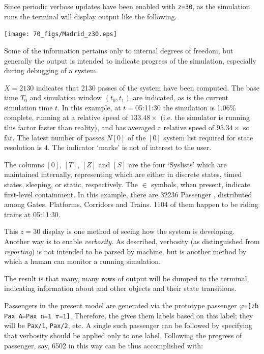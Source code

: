 Since periodic verbose updates have been enabled with {\tt z=30}, as
the simulation runs the terminal will display output like the following.

%
%
\texttt{[image: 70\_figs/Madrid\_z30.eps]}
\vspace{0.5cm}

Some of the information pertains only to internal degrees of freedom,
but generally the output is intended to indicate progress of the simulation,
especially during debugging of a system.

$X=2130$ indicates that 2130 passes of the system have been computed.
The base time $T_0$ and simulation window $(t_0,t_1)$ are indicated,
as is the current simulation time $t$. In this example, at $t=$05:11:30
the simulation is 1.06\% complete, running at a relative speed of $133.48\times$
(i.e. the simulator is running this factor faster than reality),
and has averaged a relative speed of $95.34\times$ so far. The latest number
of passes $N[0]$ of the $[0]$ system list required for state
resolution is $4$. The indicator `marks' is not of interest to the user.

The columns $[0]$, $[T]$, $[Z]$ and $[S]$ are the four
`Syslists' which are maintained internally, representing 
which are either in discrete states, timed states, sleeping, or
static, respectively. The $\in$ symbols, when present, indicate
first-level containment. In this example, there are 32236 Passenger ,
distributed among Gates, Platforms, Corridors and Trains. 1104 of them
happen to be riding trains at 05:11:30.

This $z=30$ display is one method of seeing how the system is
developing.  Another way is to enable \emph{verbosity}. As described,
verbosity (as distinguished from \emph{reporting}) is not intended to
be parsed by machine, but is another method by which a human can
monitor a running simulation.


The result is that many, many rows of output will be dumped to the terminal,
indicating information about  and other objects and their
state transitions.

Passengers in the present model are generated via the prototype
passenger  {\tt $\varphi$=[zb Pax A=Pax n=1 $\pi$=1]}.
Therefore, the  gives them labels based on this
 label; they will be {\tt Pax/1}, {\tt Pax/2}, etc.
A single such passenger can be followed by specifying that
verbosity should be applied only to one label. Following the
progress of passenger, say, 6502 in this way can be thus accomplished with:

